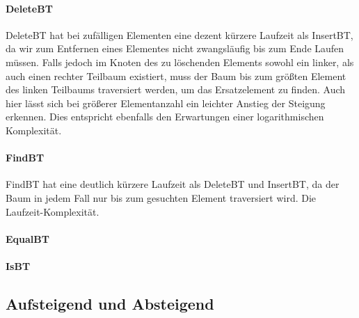 \documentclass[11pt]{article}
\begin{document}
        \paragraph{DeleteBT}  
        
        DeleteBT hat bei zufälligen Elementen eine dezent kürzere Laufzeit als InsertBT, da wir zum Entfernen eines Elementes nicht zwangsläufig bis zum Ende Laufen müssen. Falls jedoch im Knoten des zu löschenden Elements sowohl ein linker, als auch einen rechter Teilbaum existiert, muss der Baum bis zum größten Element des linken Teilbaums traversiert werden, um das Ersatzelement zu finden. Auch hier lässt sich bei größerer Elementanzahl ein leichter Anstieg der Steigung erkennen. Dies entspricht ebenfalls den Erwartungen einer logarithmischen Komplexität.

        \paragraph{FindBT}
        
        FindBT hat eine deutlich kürzere Laufzeit als DeleteBT und InsertBT, da der Baum in jedem Fall nur bis zum gesuchten Element traversiert wird. Die Laufzeit-Komplexität.

        \paragraph{EqualBT}

        \paragraph{IsBT}

    \subsection{Aufsteigend und Absteigend}\label{subsec:average}
\end{document}
